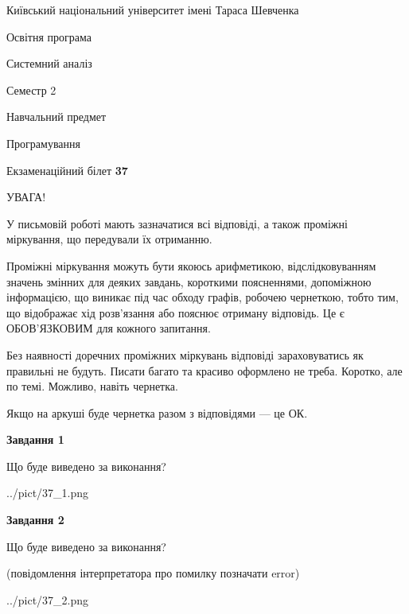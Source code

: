 \documentclass[12pt, ukrainian]{article}
\begin{document}
{{\begin {small}\par
{ \center  Київський національний університет імені Тараса Шевченка \par}
{\parbox {5 cm}{Освітня програма \hfill}{\parbox {7 cm}{Системний аналіз \hfill}}\parbox {6 cm}{\hfill Семестр 2}}\par
{\parbox {5 cm} {Навчальний предмет \hfill}\parbox {7 cm}{Програмування \hfill}\parbox {6cm}{\hfill}\par}\vspace{-7pt} \end{small}}{\center Екзаменаційний білет \No \textbf
{ 37 }\par}}
{
\begin {large}
УВАГА!

У письмовій роботі мають зазначатися всі відповіді, а також проміжні міркування, що передували їх отриманню.

Проміжні міркування можуть бути якоюсь арифметикою, відслідковуванням зна\-чень змінних для деяких завдань,
короткими поясненнями, допоміжною інформацією, що виникає під час обходу графів, робочею чернеткою,
тобто тим, що відображає хід розв’язання або пояснює отриману відповідь.
Це є ОБОВ’ЯЗКОВИМ для кожного запитання.

Без наявності доречних проміжних міркувань відповіді зараховуватись як правиль\-ні не будуть.
Писати багато та красиво оформлено не треба. Коротко, але по темі. Можли\-во, навіть чернетка.

Якщо на аркуші буде чернетка разом з відповідями --- це ОК.

\newpage

{\begin {center}\textbf{Завдання 1}\end {center}}\par
Що буде виведено за виконання?\par
\begin{center}
	{../pict/37_1.png}
\end{center}
\newpage

{\begin {center}\textbf{Завдання 2}\end {center}}\par
Що буде виведено за виконання?\par
 (повідомлення інтерпретатора про помилку позначати error)\par
\begin{center}
	{../pict/37_2.png}
\end{center}
\newpage


\end{large}}
\end{document}
